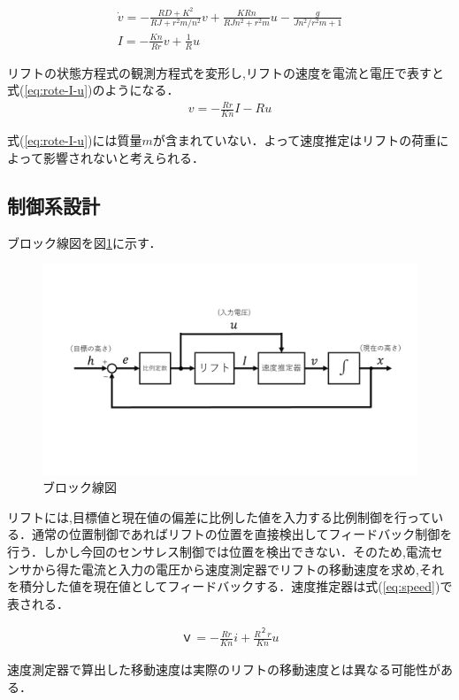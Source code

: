 \begin{eqnarray}
\dot{v}=-\frac{RD+K^2}{RJ+r^{2}m/n^2}v+\frac{KRn}{RJn^{2}+r^{2}m}u-\frac{g}{Jn^{2}/r^{2}m+1}\\
I=-\frac{Kn}{Rr}v+\frac{1}{R}u
\label{eq:system}
\end{eqnarray}

リフトの状態方程式の観測方程式を変形し,リフトの速度を電流と電圧で表すと式(\ref{eq:rote-I-u})のようになる．
\begin{eqnarray}
v=-\frac{Rr}{Kn}I-Ru
\label{eq:rote-I-u}
\end{eqnarray}

式(\ref{eq:rote-I-u})には質量$m$が含まれていない．よって速度推定はリフトの荷重によって影響されないと考えられる．

\subsection{制御系設計}ブロック線図を図\ref{fig:burokkusennzu}に示す．

\begin{figure}[htbp]
  \begin{center}
    \includegraphics[width=130mm]{img/burokkusennzu.png}
    \end{center}
  \caption{ブロック線図}
 \label{fig:burokkusennzu}
\end{figure}

リフトには,目標値と現在値の偏差に比例した値を入力する比例制御を行っている．通常の位置制御であればリフトの位置を直接検出してフィードバック制御を行う．しかし今回のセンサレス制御では位置を検出できない．そのため,電流センサから得た電流と入力の電圧から速度測定器でリフトの移動速度を求め,それを積分した値を現在値としてフィードバックする．速度推定器は式(\ref{eq:speed})で表される．

\begin{eqnarray}
ｖ=-\frac{Rr}{Kn}i+\frac{R^２r}{Kn}u
\label{eq:speed}
\end{eqnarray}

速度測定器で算出した移動速度は実際のリフトの移動速度とは異なる可能性がある．
